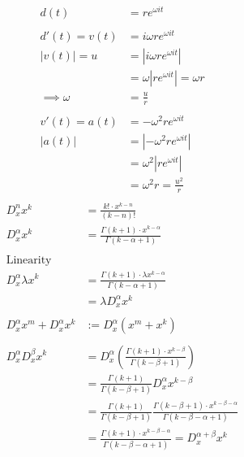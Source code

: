 \documentclass[a4paper,11pt]{article}
\theoremstyle{plain}
\theoremstyle{definition}
\begin{document}
\newpage
\begin{align*}
	d(t)&=re^{\omega i t} \\
	\\
	d'(t)=v(t)&=i\omega  r e^{\omega i t} \\
	\left|v(t)\right|=u&=\left|i\omega  r e^{\omega i t}\right| \\
	&=\omega \left|r e^{\omega i t}\right|= \omega r \\
	\implies \omega &= \frac{u}{r} \\
	\\
	v'(t)=a(t)&=-\omega^2  r e^{\omega i t} \\
	\left|a(t)\right| &= \left|-\omega^2  r e^{\omega i t}\right| \\
	&= \omega^2 \left|r e^{\omega i t}\right| \\
	&= \omega^2r = \frac{u^2}{r} \\
\end{align*}
\newpage
\begin{align*}
	D_x^n x^k &= \frac{k!\cdot x^{k-n}}{(k-n)!} \\
	D_x^\alpha x^k &= \frac{\Gamma(k+1)\cdot x^{k-\alpha}}
	{\Gamma(k-\alpha+1)} \\
	\\
	\text{Linearity}\\
	D_x^\alpha \lambda x^k &= \frac{\Gamma(k+1)\cdot \lambda x^{k-\alpha}}
	{\Gamma(k-\alpha+1)} \\
	&=\lambda D_x^\alpha x^k \\
	\\
	D_x^\alpha x^m+ D_x^\alpha x^k &:= D_x^\alpha (x^m+x^k)\\
	\\
	D_x^\alpha D_x^\beta x^k &= D_x^\alpha\left(
	\frac{\Gamma(k+1)\cdot x^{k-\beta}}{\Gamma(k-\beta+1)}\right) \\
	&=\frac{\Gamma(k+1)}{\Gamma(k-\beta+1)}
	D_x^\alpha x^{k-\beta}\\
	&=\frac{\Gamma(k+1)}{\Gamma(k-\beta+1)}
	\frac{\Gamma(k-\beta+1)\cdot x^{k-\beta-\alpha}}
	{\Gamma(k-\beta-\alpha+1)}\\
	&=\frac{\Gamma(k+1)\cdot x^{k-\beta-\alpha}}
	{\Gamma(k-\beta-\alpha+1)} = D_x^{\alpha + \beta}x^k
\end{align*}
\end{document}

